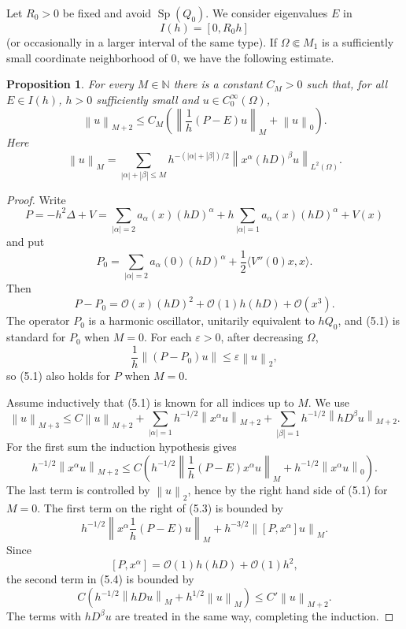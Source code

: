 \documentclass[11pt,a4paper]{article}
\newcommand{\N}{\mathbb N}
\newcommand{\Sp}{\operatorname{Sp}}
\newcommand{\cO}{\mathcal O}
\newcommand{\eps}{\varepsilon}
\newcommand{\norm}[1]{\left\lVert #1\right\rVert}
\numberwithin{equation}{section}
\newtheorem{proposition}[theorem]{Proposition}
\theoremstyle{remark}
\begin{document}
Let $R_0>0$ be fixed and avoid $\Sp(Q_0)$. We consider eigenvalues $E$ in
\[
I(h)=[0,R_0h]
\]
(or occasionally in a larger interval of the same type). If $\Omega\Subset M_1$ is a sufficiently small coordinate neighborhood of $0$, we have the following estimate.

\begin{proposition}
For every $M\in\N$ there is a constant $C_M>0$ such that, for all $E\in I(h)$, $h>0$ sufficiently small and $u\in C_0^\infty(\Omega)$,
\begin{equation}
\norm{u}_{M+2}\le C_M\left(
\norm{\frac1h(P-E)u}_M+\norm{u}_0\right).
\tag{5.1}
\end{equation}
Here
\begin{equation}
\norm{u}_M=
\sum_{|\alpha|+|\beta|\le M}
 h^{-(|\alpha|+|\beta|)/2}
 \norm{x^\alpha(hD)^\beta u}_{L^2(\Omega)}.
\tag{5.2}
\end{equation}
\end{proposition}
\begin{proof}
Write
\[
P=-h^2\Delta+V
 =\sum_{|\alpha|=2}a_\alpha(x)(hD)^\alpha
 +h\sum_{|\alpha|=1}a_\alpha(x)(hD)^\alpha+V(x)
\]
and put
\[
P_0=\sum_{|\alpha|=2}a_\alpha(0)(hD)^\alpha
+\frac12\langle V''(0)x,x\rangle.
\]
Then
\[
P-P_0=\cO(x)(hD)^2+\cO(1)h(hD)+\cO(x^3).
\]
The operator $P_0$ is a harmonic oscillator, unitarily equivalent to $hQ_0$, and (5.1) is standard for $P_0$ when $M=0$. For each $\eps>0$, after decreasing $\Omega$,
\[
\frac1h\norm{(P-P_0)u}\le\eps\norm{u}_2,
\]
so (5.1) also holds for $P$ when $M=0$.

Assume inductively that (5.1) is known for all indices up to $M$. We use
\[
\norm{u}_{M+3}\le C\norm{u}_{M+2}
 +\sum_{|\alpha|=1}h^{-1/2}\norm{x^\alpha u}_{M+2}
 +\sum_{|\beta|=1}h^{-1/2}\norm{hD^\beta u}_{M+2}.
\]
For the first sum the induction hypothesis gives
\begin{equation}
 h^{-1/2}\norm{x^\alpha u}_{M+2}
 \le C\left(
 h^{-1/2}\norm{\frac1h(P-E)x^\alpha u}_M
 +h^{-1/2}\norm{x^\alpha u}_0\right).
\tag{5.3}
\end{equation}
The last term is controlled by $\norm{u}_2$, hence by the right hand side of (5.1) for $M=0$. The first term on the right of (5.3) is bounded by
\begin{equation}
 h^{-1/2}\norm{x^\alpha\frac1h(P-E)u}_M
 +h^{-3/2}\norm{[P,x^\alpha]u}_M.
\tag{5.4}
\end{equation}
Since
\[
[P,x^\alpha]=\cO(1)h(hD)+\cO(1)h^2,
\]
the second term in (5.4) is bounded by
\[
C\left(h^{-1/2}\norm{hDu}_M+h^{1/2}\norm{u}_M\right)
\le C'\norm{u}_{M+2}.
\]
The terms with $hD^\beta u$ are treated in the same way, completing the induction.
\end{proof}
\end{document}
